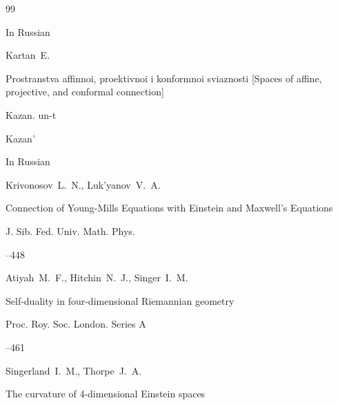 \begin{thebibliography}{99}




\lang In Russian

\by Kartan~E.

\book Prostranstva affinnoi, proektivnoi i konformnoi sviaznosti \rm [Spaces of affine, projective, and conformal connection]


\publ Kazan. un-t

\publaddr Kazan'





\lang In Russian

\by Krivonosov~L.~N., Luk'yanov~V.~A.

\paper Connection of Young-Mills Equations with Einstein and Maxwell's Equations

\jour J. Sib. Fed. Univ. Math. Phys.




--448














\by Atiyah~M.~F., Hitchin~N.~J., Singer~I.~M.

\paper Self-duality in four-dimensional Riemannian geometry

\jour Proc. Roy. Soc. London. Series A




–461











\by Singerland~I.~M., Thorpe~J.~A.

\paper The curvature of 4-dimensional Einstein spaces


\end{thebibliography}
